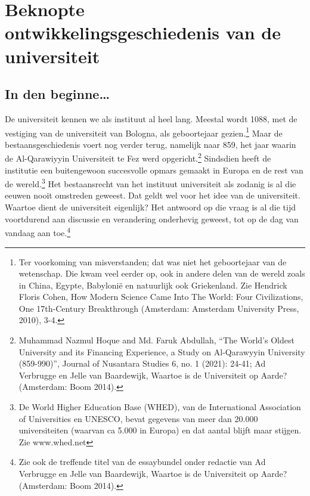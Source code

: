 \documentclass{jote-book}
\begin{document}
	\chapter{Beknopte ontwikkelingsgeschiedenis van de universiteit }











	\section{In den beginne…}



	De universiteit kennen we als instituut al heel lang. Meestal wordt 1088, met de vestiging van de universiteit van Bologna, als geboortejaar gezien.\footnote{Ter voorkoming van misverstanden; dat was niet het geboortejaar van de wetenschap. Die kwam veel eerder op, ook in andere delen van de wereld zoals in China, Egypte, Babylonië en natuurlijk ook Griekenland. Zie Hendrick Floris Cohen, How Modern Science Came Into The World: Four Civilizations, One 17th-Century Breakthrough (Amsterdam: Amsterdam University Press, 2010), 3-4.} Maar de bestaansgeschiedenis voert nog verder terug, namelijk naar 859, het jaar waarin de Al-Qarawiyyin Universiteit te Fez werd opgericht.\footnote{Muhammad Nazmul Hoque and Md. Faruk Abdullah, “The World's Oldest University and its Financing Experience, a Study on Al-Qarawyyin University (859-990)”, Journal of Nusantara Studies 6, no. 1 (2021): 24-41; Ad Verbrugge en Jelle van Baardewijk, Waartoe is de Universiteit op Aarde? (Amsterdam: Boom 2014).} Sindsdien heeft de institutie een buitengewoon succesvolle opmars gemaakt in Europa en de rest van de wereld.\footnote{De World Higher Education Base (WHED), van de International Association of Universities en UNESCO, bevat gegevens van meer dan 20.000 universiteiten (waarvan ca 5.000 in Europa) en dat aantal blijft maar stijgen. Zie www.whed.net} Het bestaansrecht van het instituut universiteit als zodanig is al die eeuwen nooit omstreden geweest. Dat geldt wel voor het idee van de universiteit. Waartoe dient de universiteit eigenlijk? Het antwoord op die vraag is al die tijd voortdurend aan discussie en verandering onderhevig geweest, tot op de dag van vandaag aan toe.\footnote{Zie ook de treffende titel van de essaybundel onder redactie van Ad Verbrugge en Jelle van Baardewijk, Waartoe is de Universiteit op Aarde? (Amsterdam: Boom 2014).}
\end{document}
